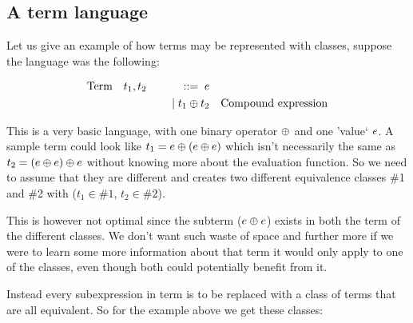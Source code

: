 




\subsection{A term language}


Let us give an example of how terms may be represented with classes, suppose the
language was the following:

\begin{equation*}
\begin{aligned}
\text{Term} \quad & t_1,t_2 \quad & ::= \; e & \\
 & & \; | \; t_1 \oplus t_2  & \quad \text{Compound expression} \\
\end{aligned}
\end{equation*}

This is a very basic language, with one binary operator $\oplus$ and one 'value` $e$. 
A sample term could look like
$t_1 = e \oplus (e \oplus e)$
which isn't necessarily the same as 
$t_2 = (e \oplus e) \oplus e$
without knowing more about the evaluation function.
So we need to assume that they are different and creates two different equivalence
classes \#1 and \#2 with ($t_1 \in \#1$, $t_2 \in \#2$).

This is however not optimal since the subterm ($e \oplus e$) exists
in both the term of the different classes. We don't want such waste of space and 
further more if we were to learn some more information about that term it
would only apply to one of the classes, even though both could potentially benefit from it. 


Instead every subexpression in term is to be replaced with a class of terms that are all equivalent.
So for the example above we get these classes:

